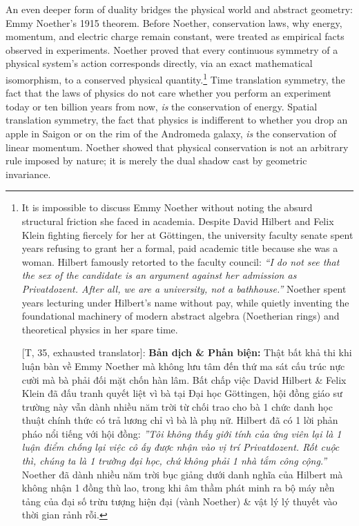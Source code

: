 \documentclass[11pt]{article}
\begin{document}
An even deeper form of duality bridges the physical world and abstract geometry: Emmy Noether's 1915 theorem. Before Noether, conservation laws, why energy, momentum, and electric charge remain constant, were treated as empirical facts observed in experiments. Noether proved that every continuous symmetry of a physical system's action corresponds directly, via an exact mathematical isomorphism, to a conserved physical quantity.\footnote{It is impossible to discuss Emmy Noether without noting the absurd structural friction she faced in academia. Despite David Hilbert and Felix Klein fighting fiercely for her at G\"ottingen, the university faculty senate spent years refusing to grant her a formal, paid academic title because she was a woman. Hilbert famously retorted to the faculty council: \textit{``I do not see that the sex of the candidate is an argument against her admission as Privatdozent. After all, we are a university, not a bathhouse.''} Noether spent years lecturing under Hilbert's name without pay, while quietly inventing the foundational machinery of modern abstract algebra (Noetherian rings) and theoretical physics in her spare time.
	
	\textsf{[T, 35, exhausted translator]:} \textbf{Bản dịch \& Phản biện:} Thật bất khả thi khi luận bàn về Emmy Noether mà không lưu tâm đến thứ ma sát cấu trúc nực cười mà bà phải đối mặt chốn hàn lâm. Bất chấp việc David Hilbert \& Felix Klein đã đấu tranh quyết liệt vì bà tại Đại học G\"ottingen, hội đồng giáo sư trường này vẫn dành nhiều năm trời từ chối trao cho bà 1 chức danh học thuật chính thức có trả lương chỉ vì bà là phụ nữ. Hilbert đã có 1 lời phản pháo nổi tiếng với hội đồng: \textit{''Tôi không thấy giới tính của ứng viên lại là 1 luận điểm chống lại việc cô ấy được nhận vào vị trí Privatdozent. Rốt cuộc thì, chúng ta là 1 trường đại học, chứ không phải 1 nhà tắm công cộng.''} Noether đã dành nhiều năm trời bục giảng dưới danh nghĩa của Hilbert mà không nhận 1 đồng thù lao, trong khi âm thầm phát minh ra bộ máy nền tảng của đại số trừu tượng hiện đại (vành Noether) \& vật lý lý thuyết vào thời gian rảnh rỗi.} Time translation symmetry, the fact that the laws of physics do not care whether you perform an experiment today or ten billion years from now, \textit{is} the conservation of energy. Spatial translation symmetry, the fact that physics is indifferent to whether you drop an apple in Saigon or on the rim of the Andromeda galaxy, \textit{is} the conservation of linear momentum. Noether showed that physical conservation is not an arbitrary rule imposed by nature; it is merely the dual shadow cast by geometric invariance.
\end{document}
